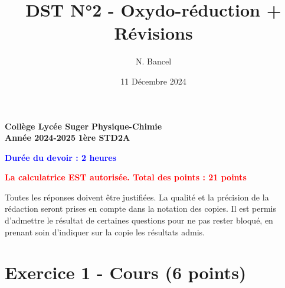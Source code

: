 \documentclass[answers]{exam}
\title{DST N°2 - Oxydo-réduction + Révisions}
\author{N. Bancel}
\date{11 Décembre 2024}
\begin{document}
\textbf{Collège Lycée Suger}
\hfill
\textbf{Physique-Chimie} \\

\textbf{Année 2024-2025}
\hfill
\textbf{1ère STD2A} \par

{\let\newpage\relax\maketitle}


\begin{center}
  \textbf{\textcolor{blue}{Durée du devoir : 2 heures}} \par
  \vspace{1em}
  \textbf{\textcolor{red}{La calculatrice EST autorisée. Total des points : 21 points}} \par
  \vspace{1em}
\end{center}

\begin{tcolorbox}[colback=gray!10!white, colframe=gray, title=Note importante]
  \itshape{Toutes les réponses doivent être justifiées.
  La qualité et la précision de la rédaction seront prises en compte dans la notation des copies.
  Il est permis d'admettre le résultat de certaines questions pour ne pas rester bloqué, en prenant soin d'indiquer sur la copie les résultats admis. \par
  }
\end{tcolorbox}

\section*{Exercice 1 - Cours (6 points)}
\end{document}
